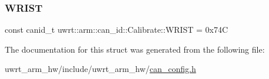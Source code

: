 \mbox{\label{structuwrt_1_1arm_1_1can__id_1_1_calibrate_a61674e5392384ebd496a6bdff1b3e383}} 
\subsubsection{\texorpdfstring{W\+R\+I\+ST}{WRIST}}
{\footnotesize\ttfamily const canid\+\_\+t uwrt\+::arm\+::can\+\_\+id\+::\+Calibrate\+::\+W\+R\+I\+ST = 0x74C\hspace{0.3cm}{\ttfamily [static]}}



The documentation for this struct was generated from the following file\+:\begin{DoxyCompactItemize}
\item 
uwrt\+\_\+arm\+\_\+hw/include/uwrt\+\_\+arm\+\_\+hw/\hyperlink{can__config_8h}{can\+\_\+config.\+h}\end{DoxyCompactItemize}
